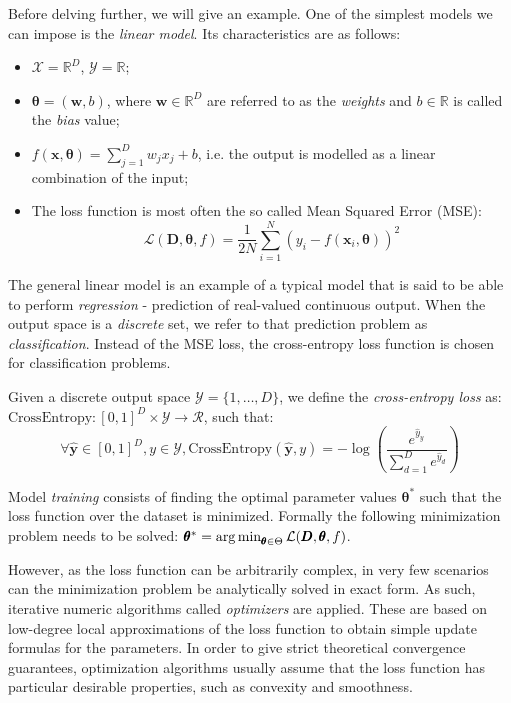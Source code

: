 Before delving further, we will give an example. One of the simplest models we can impose is the \emph{linear model}. Its characteristics are as follows:
\begin{itemize}
\item $\mathcal{X} = \mathbb{R}^D$, $\mathcal{Y}=\mathbb{R}$;
\item $\pmb{\theta} = (\pmb{w}, b)$, where $\pmb{w} \in \mathbb{R}^D$ are referred to as the \emph{weights} and $b \in \mathbb{R}$ is called the \emph{bias} value;
\item $f(\pmb{x}, \pmb{\theta}) = \sum_{j=1}^{D}{w_j x_j} + b$, i.e. the output is modelled as a linear combination of the input;
\item The loss function is most often the so called Mean Squared Error (MSE): \begin{equation}
\mathcal{L}(\pmb{D}, \pmb{\theta}, f) = \frac{1}{2N}\sum_{i=1}^{N}{(y_i - f(\pmb{x}_i, \pmb{\theta}))^2}
\end{equation}
\end{itemize}

The general linear model is an example of a typical model that is said to be able to perform \emph{regression} - prediction of real-valued continuous output. When the output space is a \emph{discrete} set, we refer to that prediction problem as \emph{classification}. Instead of the MSE loss, the cross-entropy loss function is chosen for classification problems.

\begin{definition}
Given a discrete output space $\mathcal{Y}=\{1,\dots,D\}$, we define the \emph{cross-entropy loss} as: $\text{CrossEntropy}: [0, 1]^D \times \mathcal{Y} \to \mathcal{R}$, such that:
\begin{equation}
\forall \hat{\pmb{y}} \in [0, 1]^D, y \in \mathcal{Y}, \text{CrossEntropy}(\hat{\pmb{y}},y)= - \log{\left(\frac{e^{\hat{y}_y}}{\sum_{d=1}^{D}{e^{\hat{y}_d}}}\right)}\end{equation}
\end{definition}

\begin{definition}
Model \emph{training} consists of finding the optimal parameter values $\pmb{\theta}^*$ such that the loss function over the dataset is minimized. Formally the following minimization problem needs to be solved: $\pmb{\theta}^* = \operatorname*{arg\,min}_{\pmb{\theta} \in \Theta}{\mathcal{L}(\pmb{D}, \pmb{\theta}, f)}$.
\end{definition}

However, as the loss function can be arbitrarily complex, in very few scenarios can the minimization problem be analytically solved in exact form. As such, iterative numeric algorithms called \emph{optimizers} are applied. These are based on low-degree local approximations of the loss function to obtain simple update formulas for the parameters. In order to give strict theoretical convergence guarantees, optimization algorithms usually assume that the loss function has particular desirable properties, such as convexity and smoothness.

